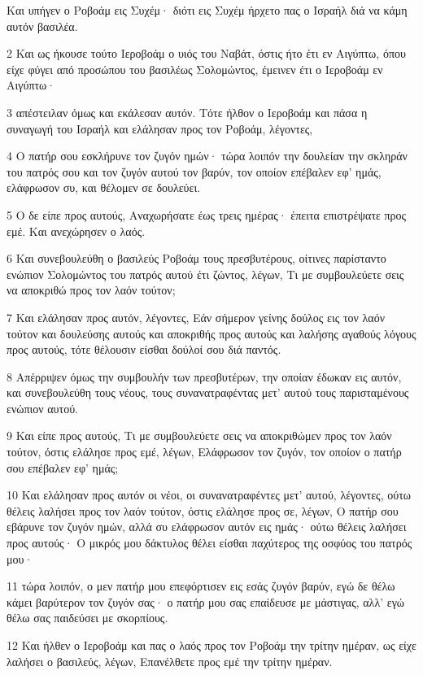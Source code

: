 \par Και υπήγεν ο Ροβοάμ εις Συχέμ· διότι εις Συχέμ ήρχετο πας ο Ισραήλ διά να κάμη αυτόν βασιλέα.
\par 2 Και ως ήκουσε τούτο Ιεροβοάμ ο υιός του Ναβάτ, όστις ήτο έτι εν Αιγύπτω, όπου είχε φύγει από προσώπου του βασιλέως Σολομώντος, έμεινεν έτι ο Ιεροβοάμ εν Αιγύπτω·
\par 3 απέστειλαν όμως και εκάλεσαν αυτόν. Τότε ήλθον ο Ιεροβοάμ και πάσα η συναγωγή του Ισραήλ και ελάλησαν προς τον Ροβοάμ, λέγοντες,
\par 4 Ο πατήρ σου εσκλήρυνε τον ζυγόν ημών· τώρα λοιπόν την δουλείαν την σκληράν του πατρός σου και τον ζυγόν αυτού τον βαρύν, τον οποίον επέβαλεν εφ' ημάς, ελάφρωσον συ, και θέλομεν σε δουλεύει.
\par 5 Ο δε είπε προς αυτούς, Αναχωρήσατε έως τρεις ημέρας· έπειτα επιστρέψατε προς εμέ. Και ανεχώρησεν ο λαός.
\par 6 Και συνεβουλεύθη ο βασιλεύς Ροβοάμ τους πρεσβυτέρους, οίτινες παρίσταντο ενώπιον Σολομώντος του πατρός αυτού έτι ζώντος, λέγων, Τι με συμβουλεύετε σεις να αποκριθώ προς τον λαόν τούτον;
\par 7 Και ελάλησαν προς αυτόν, λέγοντες, Εάν σήμερον γείνης δούλος εις τον λαόν τούτον και δουλεύσης αυτούς και αποκριθής προς αυτούς και λαλήσης αγαθούς λόγους προς αυτούς, τότε θέλουσιν είσθαι δούλοί σου διά παντός.
\par 8 Απέρριψεν όμως την συμβουλήν των πρεσβυτέρων, την οποίαν έδωκαν εις αυτόν, και συνεβουλεύθη τους νέους, τους συνανατραφέντας μετ' αυτού τους παρισταμένους ενώπιον αυτού.
\par 9 Και είπε προς αυτούς, Τι με συμβουλεύετε σεις να αποκριθώμεν προς τον λαόν τούτον, όστις ελάλησε προς εμέ, λέγων, Ελάφρωσον τον ζυγόν, τον οποίον ο πατήρ σου επέβαλεν εφ' ημάς;
\par 10 Και ελάλησαν προς αυτόν οι νέοι, οι συνανατραφέντες μετ' αυτού, λέγοντες, ούτω θέλεις λαλήσει προς τον λαόν τούτον, όστις ελάλησε προς σε, λέγων, Ο πατήρ σου εβάρυνε τον ζυγόν ημών, αλλά συ ελάφρωσον αυτόν εις ημάς· ούτω θέλεις λαλήσει προς αυτούς· Ο μικρός μου δάκτυλος θέλει είσθαι παχύτερος της οσφύος του πατρός μου·
\par 11 τώρα λοιπόν, ο μεν πατήρ μου επεφόρτισεν εις εσάς ζυγόν βαρύν, εγώ δε θέλω κάμει βαρύτερον τον ζυγόν σας· ο πατήρ μου σας επαίδευσε με μάστιγας, αλλ' εγώ θέλω σας παιδεύσει με σκορπίους.
\par 12 Και ήλθεν ο Ιεροβοάμ και πας ο λαός προς τον Ροβοάμ την τρίτην ημέραν, ως είχε λαλήσει ο βασιλεύς, λέγων, Επανέλθετε προς εμέ την τρίτην ημέραν.

